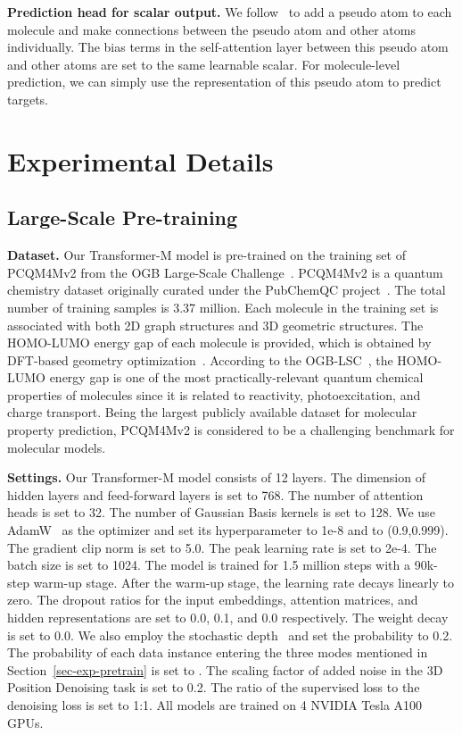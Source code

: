\documentclass{article} \usepackage[dvipsnames]{xcolor}
\begin{document}
\textbf{Prediction head for scalar output.}
We follow~\citet{ying2021transformers} to add a pseudo atom to each molecule and make connections between the pseudo atom and other atoms individually. The bias terms in the self-attention layer between this pseudo atom and other atoms are set to the same learnable scalar. For molecule-level prediction, we can simply use the representation of this pseudo atom to predict targets. 
\vspace{-4pt}
\section{Experimental Details}
\vspace{-4pt}
\subsection{Large-Scale Pre-training}
\label{appendix:pre-train}
\textbf{Dataset.} 
Our Transformer-M model is pre-trained on the training set of PCQM4Mv2 from the OGB Large-Scale Challenge~\citep{hu2021ogb}. PCQM4Mv2 is a quantum chemistry dataset originally curated under the PubChemQC project~\citep{maho2015pubchemqc,nakata2017pubchemqc}. The total number of training samples is 3.37 million. Each molecule in the training set is associated with both 2D graph structures and 3D geometric structures. The HOMO-LUMO energy gap of each molecule is provided, which is obtained by DFT-based geometry optimization~\citep{burke2012perspective}. According to the OGB-LSC~\citep{hu2021ogb}, the HOMO-LUMO energy gap is one of the most practically-relevant quantum chemical properties of molecules since it is related to reactivity, photoexcitation, and charge transport. Being the largest publicly available dataset for molecular property prediction, PCQM4Mv2 is considered to be a challenging benchmark for molecular models.

\textbf{Settings.} Our Transformer-M model consists of 12 layers. The dimension of hidden layers and feed-forward layers is set to 768. The number of attention heads is set to 32. The number of Gaussian Basis kernels is set to 128. We use AdamW~\citep{kingma2014adam} as the optimizer and set its hyperparameter  to 1e-8 and  to (0.9,0.999). The gradient clip norm is set to 5.0. The peak learning rate is set to 2e-4. The batch size is set to 1024. The model is trained for 1.5 million steps with a 90k-step warm-up stage. After the warm-up stage, the learning rate decays linearly to zero. The dropout ratios for the input embeddings, attention matrices, and hidden representations are set to 0.0, 0.1, and 0.0 respectively. The weight decay is set to 0.0. We also employ the stochastic depth~\citep{huang2016deep} and set the probability to 0.2. The probability  of each data instance entering the three modes mentioned in Section~\ref{sec-exp-pretrain} is set to . The scaling factor  of added noise in the 3D Position Denoising task is set to 0.2. The ratio of the supervised loss to the denoising loss is set to 1:1. All models are trained on 4 NVIDIA Tesla A100 GPUs.
\end{document}
